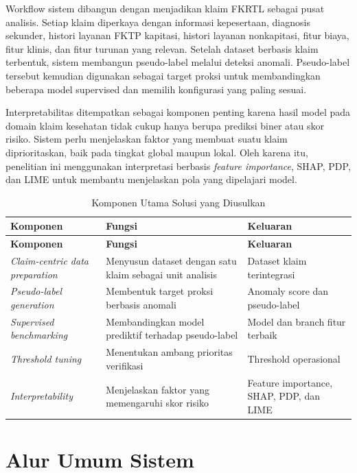 Workflow sistem dibangun dengan menjadikan klaim FKRTL sebagai pusat analisis. Setiap klaim diperkaya dengan informasi kepesertaan, diagnosis sekunder, histori layanan FKTP kapitasi, histori layanan nonkapitasi, fitur biaya, fitur klinis, dan fitur turunan yang relevan. Setelah dataset berbasis klaim terbentuk, sistem membangun pseudo-label melalui deteksi anomali. Pseudo-label tersebut kemudian digunakan sebagai target proksi untuk membandingkan beberapa model supervised dan memilih konfigurasi yang paling sesuai.

Interpretabilitas ditempatkan sebagai komponen penting karena hasil model pada domain klaim kesehatan tidak cukup hanya berupa prediksi biner atau skor risiko. Sistem perlu menjelaskan faktor yang membuat suatu klaim diprioritaskan, baik pada tingkat global maupun lokal. Oleh karena itu, penelitian ini menggunakan interpretasi berbasis \emph{feature importance}, SHAP, PDP, dan LIME untuk membantu menjelaskan pola yang dipelajari model.

\begin{longtable}[]{@{}p{}p{}p{}@{}}
\caption{Komponen Utama Solusi yang Diusulkan}\label{tab:komponen-solusi}\\
\toprule
\textbf{Komponen} & \textbf{Fungsi} & \textbf{Keluaran} \\
\midrule
\endfirsthead
\toprule
\textbf{Komponen} & \textbf{Fungsi} & \textbf{Keluaran} \\
\midrule
\endhead
\bottomrule
\endfoot
\emph{Claim-centric data preparation} & Menyusun dataset dengan satu klaim sebagai unit analisis & Dataset klaim terintegrasi \\
\emph{Pseudo-label generation} & Membentuk target proksi berbasis anomali & Anomaly score dan pseudo-label \\
\emph{Supervised benchmarking} & Membandingkan model prediktif terhadap pseudo-label & Model dan branch fitur terbaik \\
\emph{Threshold tuning} & Menentukan ambang prioritas verifikasi & Threshold operasional \\
\emph{Interpretability} & Menjelaskan faktor yang memengaruhi skor risiko & Feature importance, SHAP, PDP, dan LIME \\
\end{longtable}

\section{Alur Umum Sistem}\label{alur-umum-sistem}

